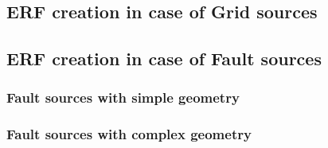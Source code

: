 %
\subsection{ERF creation in case of Grid sources}

%
\subsection{ERF creation in case of Fault sources}

%
\subsubsection{Fault sources with simple geometry}

%
\subsubsection{Fault sources with complex geometry}
